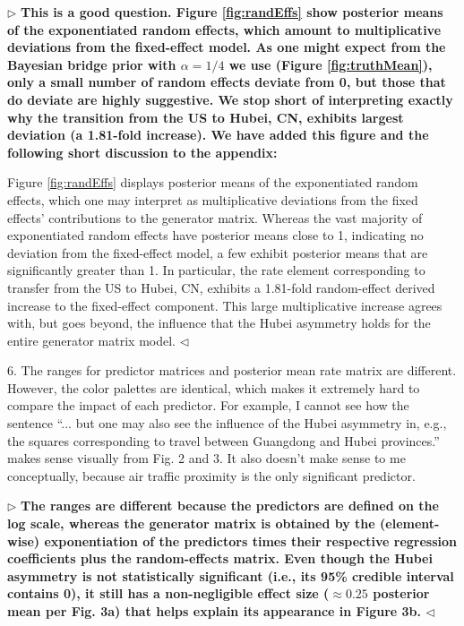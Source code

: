\documentclass[12pt]{article}
\newenvironment{reply}{$\triangleright$\bfseries}{$\triangleleft$}
\renewenvironment{quote}
               {\list{}{\rightmargin\leftmargin}%
                \item\relax\normalfont}
               {\endlist}
\begin{document}
\begin{reply}
This is a good question.  Figure \ref{fig:randEffs} show posterior means of the exponentiated random effects, which amount to multiplicative deviations from the fixed-effect model.  As one might expect from the Bayesian bridge prior with $\alpha=1/4$ we use (Figure \ref{fig:truthMean}), only a small number of random effects deviate from 0, but those that do deviate are highly suggestive.  We stop short of interpreting exactly why the transition from the US to Hubei, CN, exhibits largest deviation (a 1.81-fold increase).  We have added this figure and the following short discussion to the appendix:
	\begin{quote}
		Figure \ref{fig:randEffs} displays posterior means of the exponentiated random effects, which one may interpret as multiplicative deviations from the fixed effects' contributions to the generator matrix.  Whereas the vast majority of exponentiated random effects have posterior means close to 1, indicating no deviation from the fixed-effect model, a few exhibit posterior means that are significantly greater than 1.  In particular, the rate element corresponding to transfer from the US to Hubei, CN, exhibits a 1.81-fold random-effect derived increase to the fixed-effect component.  This large multiplicative increase agrees with, but goes beyond, the influence that the Hubei asymmetry holds for the entire generator matrix model. 
	\end{quote}	
\end{reply}

6. The ranges for predictor matrices and posterior mean rate matrix are different. However, the color palettes are identical, which makes it extremely hard to compare the impact of each predictor. For example, I cannot see how the sentence ``... but one may also see the influence of the Hubei asymmetry in, e.g., the squares corresponding to travel between Guangdong and Hubei provinces.'' makes sense visually from Fig. 2 and 3. It also doesn’t make sense to me conceptually, because air traffic proximity is the only significant predictor.


\begin{reply}
The ranges are different because the predictors are defined on the log scale, whereas the generator matrix is obtained by the (element-wise) exponentiation of the predictors times their respective regression coefficients plus the random-effects matrix.  Even though the Hubei asymmetry is not statistically significant (i.e., its 95\% credible interval contains 0), it still has a non-negligible effect size ($\approx 0.25$ posterior mean per Fig. 3a) that helps explain its appearance in Figure 3b.
\end{reply}
\end{document}
